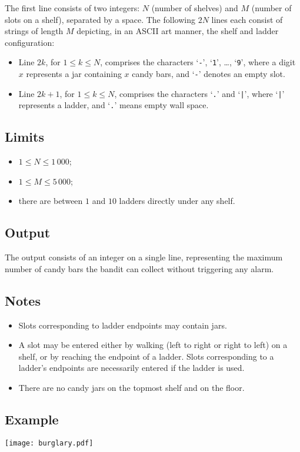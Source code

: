 The first line consists of two integers: $N$ (number of shelves) and $M$
(number of slots on a shelf), separated by a space.
The following $2N$ lines each consist of strings of length $M$ depicting, in an ASCII art manner, the shelf and ladder configuration:

\begin{itemize}
\item Line $2k$, for $1\leq k\leq N$, comprises the characters
  `\texttt{-}', `\texttt{1}', \dots, `\texttt{9}', where a digit $x$
    represents a jar containing $x$ candy bars, and `\texttt{-}' denotes
    an empty slot.

\item Line $2k+1$, for $1\leq k\leq N$, comprises the characters
  `\texttt{.}' and `\texttt{|}', where `\texttt{|}' represents a ladder,
    and `\texttt{.}' means empty wall space.
\end{itemize}

\subsection*{Limits}

\begin{itemize}
\item $1\leq N\leq 1\,000$;

\item $1\leq M\leq 5\,000$;

\item there are between $1$ and $10$ ladders directly under any shelf.
\end{itemize}


\subsection*{Output}

The output consists of an integer on a single line, representing the
maximum number of candy bars the bandit can collect without triggering any
alarm.

\subsection*{Notes}
\begin{itemize}
\item Slots corresponding to ladder endpoints may contain jars.

\item A slot may be entered either by walking (left to right or right to
  left) on a shelf, or by reaching the endpoint of a ladder. Slots corresponding to a ladder's endpoints are necessarily entered if the ladder is used.

\item There are no candy jars on the topmost shelf and on the floor.

\end{itemize}

\subsection*{Example}

\begin{center}
\texttt{[image: burglary.pdf]}
\end{center}
